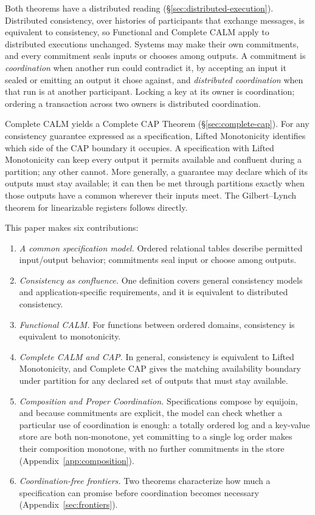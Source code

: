 Both theorems have a distributed reading (\S\ref{sec:distributed-execution}).
Distributed consistency, over histories of participants that exchange
messages, is equivalent to consistency, so Functional and Complete CALM apply
to distributed executions unchanged.  Systems may make their own commitments,
and every commitment seals inputs or chooses among outputs.  A commitment is
\emph{coordination} when another run could contradict it, by accepting an
input it sealed or emitting an output it chose against, and \emph{distributed
coordination} when that run is at another participant.  Locking a key at its
owner is coordination; ordering a transaction across two owners is
distributed coordination.

Complete CALM yields a Complete CAP Theorem
(\S\ref{sec:complete-cap}).  For any consistency guarantee expressed as a
specification, Lifted Monotonicity identifies which side of the CAP boundary it
occupies.  A specification with Lifted Monotonicity can keep every output it permits
available and confluent during a partition; any other cannot.  More generally,
a guarantee may declare which of its outputs must stay available; it can then
be met through partitions exactly when those outputs have a common \outnoun
wherever their inputs meet.  The Gilbert--Lynch theorem for linearizable
registers follows directly.

This paper makes six contributions:
\begin{enumerate}
  \item \emph{A common specification model.} Ordered relational tables describe
        permitted input/output behavior; commitments seal input or choose
        among outputs.
  \item \emph{Consistency as confluence.} One definition covers general
        consistency models and application-specific requirements, and it is
        equivalent to distributed consistency.
  \item \emph{Functional CALM.} For functions between ordered domains,
        consistency is equivalent to monotonicity.
  \item \emph{Complete CALM and CAP.} In general, consistency is equivalent
        to Lifted Monotonicity, and Complete CAP gives the matching
        availability boundary under partition for any declared set of outputs
        that must stay available.
  \item \emph{Composition and Proper Coordination.} Specifications compose by
        equijoin, and because commitments are explicit, the model can check
        whether a particular use of coordination is enough: a totally ordered
        log and a key-value store are both non-monotone, yet committing to a
        single log order makes their composition monotone, with no further
        commitments in the store (Appendix~\ref{app:composition}).
  \item \emph{Coordination-free frontiers.} Two theorems characterize how much
        a specification can promise before coordination becomes necessary
        (Appendix~\ref{sec:frontiers}).
\end{enumerate}

